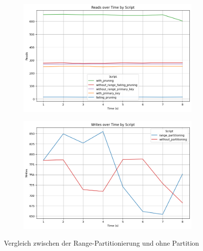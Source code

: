 \vspace{-8pt}
\begin{figure}[H]
	\centering
	\begin{subfigure}[t]{0.48\textwidth}
		\includegraphics[width=\textwidth]{PNGs/Script/Partition/range-partition/Reads}
	\end{subfigure}
	\hfill
	\begin{subfigure}[t]{0.48\textwidth}
		\includegraphics[width=\textwidth]{PNGs/Script/Partition/range-partition/Writes}
	\end{subfigure}
	\vspace{-20pt}
	\caption[Range-Partitionierung: Unterschiedliche Selects mit und ohne Partition]{Vergleich zwischen der Range-Partitionierung und ohne Partition}
	\label{fig:range-partition}
\end{figure}
\vspace{-20pt}

